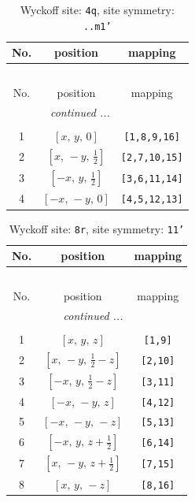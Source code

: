 \documentclass[fleqn,8pt]{jsarticle}
\begin{document}
\renewcommand{\arraystretch}{1.2}
\begin{longtable}{ccc}
\caption{Wyckoff site: {\tt 4q}, site symmetry: {\tt ..m1'}}
 \\
 \hline \hline
No. & position & mapping \\ \hline \endfirsthead

\multicolumn{2}{l}{\tablename\ \thetable{}} \\
 \hline \hline
No. & position & mapping \\ \hline \endhead

 \hline \hline
\multicolumn{2}{r}{\footnotesize\it continued ...} \\ \endfoot

 \hline \hline
\multicolumn{2}{r}{} \\ \endlastfoot

1 & $\left[ x,\, y,\, 0 \right]$ & {\tt [1,8,9,16]} \\ \hline
2 & $\left[ x,\, - y,\, \frac{1}{2} \right]$ & {\tt [2,7,10,15]} \\ \hline
3 & $\left[ - x,\, y,\, \frac{1}{2} \right]$ & {\tt [3,6,11,14]} \\ \hline
4 & $\left[ - x,\, - y,\, 0 \right]$ & {\tt [4,5,12,13]} \\
\end{longtable}
\renewcommand{\arraystretch}{1.2}
\begin{longtable}{ccc}
\caption{Wyckoff site: {\tt 8r}, site symmetry: {\tt 11'}}
 \\
 \hline \hline
No. & position & mapping \\ \hline \endfirsthead

\multicolumn{2}{l}{\tablename\ \thetable{}} \\
 \hline \hline
No. & position & mapping \\ \hline \endhead

 \hline \hline
\multicolumn{2}{r}{\footnotesize\it continued ...} \\ \endfoot

 \hline \hline
\multicolumn{2}{r}{} \\ \endlastfoot

1 & $\left[ x,\, y,\, z \right]$ & {\tt [1,9]} \\ \hline
2 & $\left[ x,\, - y,\, \frac{1}{2} - z \right]$ & {\tt [2,10]} \\ \hline
3 & $\left[ - x,\, y,\, \frac{1}{2} - z \right]$ & {\tt [3,11]} \\ \hline
4 & $\left[ - x,\, - y,\, z \right]$ & {\tt [4,12]} \\ \hline
5 & $\left[ - x,\, - y,\, - z \right]$ & {\tt [5,13]} \\ \hline
6 & $\left[ - x,\, y,\, z + \frac{1}{2} \right]$ & {\tt [6,14]} \\ \hline
7 & $\left[ x,\, - y,\, z + \frac{1}{2} \right]$ & {\tt [7,15]} \\ \hline
8 & $\left[ x,\, y,\, - z \right]$ & {\tt [8,16]} \\
\end{longtable}
\end{document}
